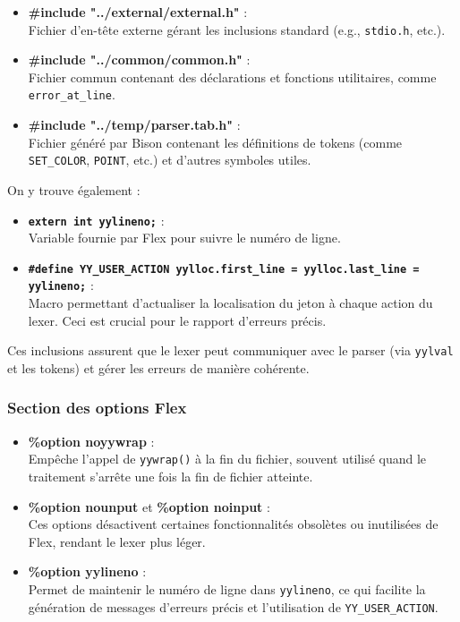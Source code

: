 \documentclass[12pt,a4paper]{article}
\begin{document}
\begin{itemize}
    \item \textbf{\#include "../external/external.h"} : \\
    Fichier d’en-tête externe gérant les inclusions standard (e.g., \texttt{stdio.h}, etc.).

    \item \textbf{\#include "../common/common.h"} : \\
    Fichier commun contenant des déclarations et fonctions utilitaires, comme \texttt{error\_at\_line}.

    \item \textbf{\#include "../temp/parser.tab.h"} : \\
    Fichier généré par Bison contenant les définitions de tokens (comme \texttt{SET\_COLOR}, \texttt{POINT}, etc.) et d’autres symboles utiles.
\end{itemize}

On y trouve également :

\begin{itemize}
    \item \textbf{\texttt{extern int yylineno;}} : \\
    Variable fournie par Flex pour suivre le numéro de ligne.

    \item \textbf{\texttt{\#define YY\_USER\_ACTION yylloc.first\_line = yylloc.last\_line = yylineno;}} : \\
    Macro permettant d’actualiser la localisation du jeton à chaque action du lexer. Ceci est crucial pour le rapport d’erreurs précis.
\end{itemize}

Ces inclusions assurent que le lexer peut communiquer avec le parser (via \texttt{yylval} et les tokens) et gérer les erreurs de manière cohérente.

\subsubsection{Section des options Flex}

\begin{itemize}
    \item \textbf{\%option noyywrap} : \\
    Empêche l’appel de \texttt{yywrap()} à la fin du fichier, souvent utilisé quand le traitement s’arrête une fois la fin de fichier atteinte.

    \item \textbf{\%option nounput} et \textbf{\%option noinput} : \\
    Ces options désactivent certaines fonctionnalités obsolètes ou inutilisées de Flex, rendant le lexer plus léger.

    \item \textbf{\%option yylineno} : \\
    Permet de maintenir le numéro de ligne dans \texttt{yylineno}, ce qui facilite la génération de messages d’erreurs précis et l’utilisation de \texttt{YY\_USER\_ACTION}.
\end{itemize}
\end{document}
